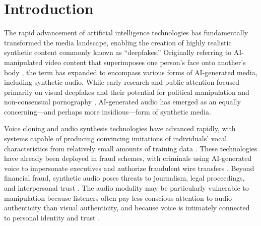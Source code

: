 \documentclass[12pt, a4paper]{article}
\begin{document}
\begin{abstract}
\noindent
\textbf{Conclusions:} Multimodal priming with AI-generated content appears to serve a protective rather than deceptive function, potentially by raising awareness of synthetic media and calibrating perceptual expectations. These findings challenge assumptions about priming-induced vulnerability and suggest that exposure to AI-generated content may support rather than undermine media authenticity judgments.

\vspace{0.5em}
\noindent
\textbf{Keywords:} deepfake audio, visual priming, false memory, AI-generated media, source monitoring, media authenticity, EEG, event-related potentials, alpha asymmetry
\end{abstract}

\newpage


\section{Introduction}

The rapid advancement of artificial intelligence technologies has fundamentally transformed the media landscape, enabling the creation of highly realistic synthetic content commonly known as ``deepfakes.'' Originally referring to AI-manipulated video content that superimposes one person's face onto another's body \citep{chesney2019deep}, the term has expanded to encompass various forms of AI-generated media, including synthetic audio. While early research and public attention focused primarily on visual deepfakes and their potential for political manipulation and non-consensual pornography \citep{vaccari2020deepfakes, citron2022deepfakes}, AI-generated audio has emerged as an equally concerning---and perhaps more insidious---form of synthetic media.

Voice cloning and audio synthesis technologies have advanced rapidly, with systems capable of producing convincing imitations of individuals' vocal characteristics from relatively small amounts of training data \citep{arik2018neural, jia2018transfer}. These technologies have already been deployed in fraud schemes, with criminals using AI-generated voice to impersonate executives and authorize fraudulent wire transfers \citep{stupp2019fraudsters}. Beyond financial fraud, synthetic audio poses threats to journalism, legal proceedings, and interpersonal trust \citep{chesney2019deep}. The audio modality may be particularly vulnerable to manipulation because listeners often pay less conscious attention to audio authenticity than visual authenticity, and because voice is intimately connected to personal identity and trust \citep{kreiman2011foundations}.
\end{document}
